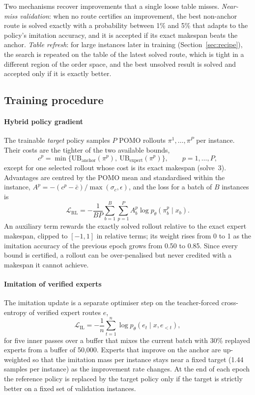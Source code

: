 \documentclass[preprint,review,12pt,authoryear]{elsarticle}
\newcommand{\UB}{\mathrm{UB}}
\begin{document}
Two mechanisms recover improvements that a single loose table misses. \emph{Near-miss validation}: when no route
certifies an improvement, the best non-anchor route is solved exactly with a probability between 1\% and 5\% that
adapts to the policy's imitation accuracy, and it is accepted if its exact makespan beats the anchor.
\emph{Table refresh}: for large instances later in training (Section~\ref{sec:recipe}), the search is repeated on
the table of the latest solved route, which is tight in a different region of the order space, and the best
unsolved result is solved and accepted only if it is exactly better.

\subsection{Training procedure}\label{sec:training}

\paragraph{Hybrid policy gradient} The trainable \emph{target} policy samples $P$ POMO rollouts
$\pi^{1},\dots,\pi^{P}$ per instance. Their costs are the tighter of the two available bounds,
\begin{equation}\label{eq:hybridcost}
c^{p}=\min\{\UB_{\text{anchor}}(\pi^{p}),\ \UB_{\text{expert}}(\pi^{p})\},\qquad p=1,\dots,P,
\end{equation}
except for one selected rollout whose cost is its exact makespan (solve~3). Advantages are centred by the POMO mean
and standardised within the instance, $A^{p}=-(c^{p}-\bar c)/\max(\sigma_c,\epsilon)$, and the loss for a batch of
$B$ instances is
\begin{equation}\label{eq:lrl}
\mathcal L_{\mathrm{RL}}=-\frac{1}{BP}\sum_{b=1}^{B}\sum_{p=1}^{P}A^{p}_b\log p_\theta(\pi^{p}_b\mid x_b).
\end{equation}
An auxiliary term rewards the exactly solved rollout relative to the exact expert makespan, clipped to $[-1,1]$ in
relative terms; its weight rises from 0 to 1 as the imitation accuracy of the previous epoch grows from 0.50 to
0.85. Since every bound is certified, a rollout can be over-penalised but never credited with a makespan it
cannot achieve.

\paragraph{Imitation of verified experts} The imitation update is a separate optimiser step on the
teacher-forced cross-entropy of verified expert routes $e$,
\begin{equation}\label{eq:lil}
\mathcal L_{\mathrm{IL}}=-\frac{1}{n}\sum_{t=1}^{n}\log p_\theta(e_t\mid x,e_{<t}),
\end{equation}
for five inner passes over a buffer that mixes the current batch with 30\% replayed experts from a buffer of
50{,}000. Experts that improve on the anchor are up-weighted so that the imitation mass per instance stays near a
fixed target (1.44 samples per instance) as the improvement rate changes. At the end of each epoch the reference
policy is replaced by the target policy only if the target is strictly better on a fixed set of validation
instances.
\end{document}
